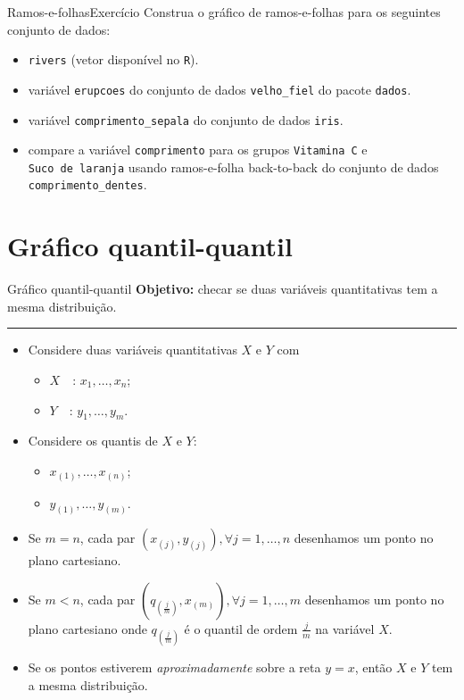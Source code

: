 \documentclass[
  10pt,
  ignorenonframetext,
]{beamer}
\providecommand{\tightlist}{%
  \setlength{\itemsep}{0pt}\setlength{\parskip}{0pt}}\usepackage{longtable,booktabs,array}
\newcommand*{\regrafina}{\rule{\textwidth}{0.5pt}}
\begin{document}
\begin{frame}[fragile]{Ramos-e-folhas\newline Exercício}
\protect\hypertarget{ramos-e-folhasexercuxedcio}{}
Construa o gráfico de ramos-e-folhas para os seguintes conjunto de
dados:

\begin{itemize}
\tightlist
\item
  \texttt{rivers} (vetor disponível no \texttt{R}).
\item
  variável \texttt{erupcoes} do conjunto de dados \texttt{velho\_fiel}
  do pacote \texttt{dados}.
\item
  variável \texttt{comprimento\_sepala} do conjunto de dados
  \texttt{iris}.
\item
  compare a variável \texttt{comprimento} para os grupos
  \texttt{Vitamina\ C} e \texttt{Suco\ de\ laranja} usando ramos-e-folha
  back-to-back do conjunto de dados \texttt{comprimento\_dentes}.
\end{itemize}
\end{frame}

\hypertarget{gruxe1fico-quantil-quantil}{%
\section{Gráfico quantil-quantil}\label{gruxe1fico-quantil-quantil}}

\begin{frame}{Gráfico quantil-quantil}
\protect\hypertarget{gruxe1fico-quantil-quantil-1}{}
\textbf{Objetivo:} checar se duas variáveis quantitativas tem a mesma
distribuição.

\regrafina

\begin{itemize}
\tightlist
\item
  Considere duas variáveis quantitativas \(X\) e \(Y\) com

  \begin{itemize}
  \tightlist
  \item
    \(X\quad\): \(x_1, \dots, x_n\);
  \item
    \(Y\quad\): \(y_1, \dots, y_m\).
  \end{itemize}
\item
  Considere os quantis de \(X\) e \(Y\):

  \begin{itemize}
  \tightlist
  \item
    \(x_{(1)}, \dots, x_{(n)}\);
  \item
    \(y_{(1)}, \dots, y_{(m)}\).
  \end{itemize}
\item
  Se \(m=n\), cada par \((x_(j), y_{(j)}), \forall j=1, \dots, n\)
  desenhamos um ponto no plano cartesiano.
\item
  Se \(m<n\), cada par
  \((q_{(\frac{j}{m})}, x_{(m)}), \forall j=1, \dots,m\) desenhamos um
  ponto no plano cartesiano onde \(q_{(\frac{j}{m})}\) é o quantil de
  ordem \(\frac{j}{m}\) na variável \(X\).
\item
  Se os pontos estiverem \emph{aproximadamente} sobre a reta \(y=x\),
  então \(X\) e \(Y\) tem a mesma distribuição.
\end{itemize}
\end{frame}
\end{document}
